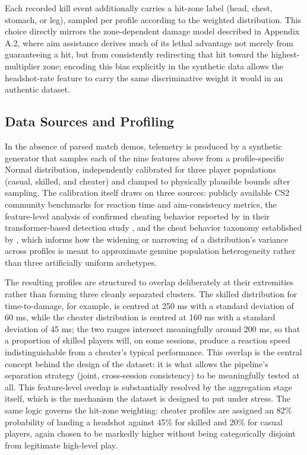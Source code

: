 Each recorded kill event additionally carries a hit-zone label (head, chest, stomach, or leg), sampled per profile according to the weighted distribution. This choice directly mirrors the zone-dependent damage model described in Appendix A.2, where aim assistance derives much of its lethal advantage not merely from guaranteeing a hit, but from consistently redirecting that hit toward the highest-multiplier zone; encoding this bias explicitly in the synthetic data allows the headshot-rate feature to carry the same discriminative weight it would in an authentic dataset.

\subsection{Data Sources and Profiling}
\label{sec:three:two:two}

In the absence of parsed match demos, telemetry is produced by a synthetic generator that samples each of the nine features above from a profile-specific Normal distribution, independently calibrated for three player populations (casual, skilled, and cheater) and clamped to physically plausible bounds after sampling. The calibration itself draws on three sources: publicly available CS2 community benchmarks for reaction time and aim-consistency metrics, the feature-level analysis of confirmed cheating behavior reported by \citeauthor{Loo2025} in their transformer-based detection study \cite{Loo2025}, and the cheat behavior taxonomy established by \citeauthor{Collins2024} \cite{Collins2024}, which informs how the widening or narrowing of a distribution's variance across profiles is meant to approximate genuine population heterogeneity rather than three artificially uniform archetypes.

The resulting profiles are structured to overlap deliberately at their extremities rather than forming three cleanly separated clusters. The skilled distribution for time-to-damage, for example, is centred at 250 ms with a standard deviation of 60 ms, while the cheater distribution is centred at 160 ms with a standard deviation of 45 ms; the two ranges intersect meaningfully around 200 ms, so that a proportion of skilled players will, on some sessions, produce a reaction speed indistinguishable from a cheater's typical performance. This overlap is the central concept behind the design of the dataset: it is what allows the pipeline's separation strategy (joint, cross-session consistency) to be meaningfully tested at all. This feature-level overlap is substantially resolved by the aggregation stage itself, which is the mechanism the dataset is designed to put under stress. The same logic governs the hit-zone weighting: cheater profiles are assigned an 82\% probability of landing a headshot against 45\% for skilled and 20\% for casual players, again chosen to be markedly higher without being categorically disjoint from legitimate high-level play.

